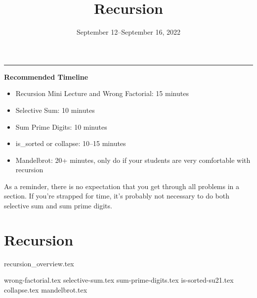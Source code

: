 \documentclass{exam}
\title{Recursion}
\date{September 12--September 16, 2022}
\begin{document}
\maketitle
\rule{\textwidth}{0.15em}
\fontsize{12}{15}\selectfont

\begin{meta}
\textbf{Recommended Timeline}
\begin{itemize}
    \item Recursion Mini Lecture and Wrong Factorial: 15 minutes
    \item Selective Sum: 10 minutes
    \item Sum Prime Digits: 10 minutes
    \item is\_sorted or collapse: 10--15 minutes
    \item Mandelbrot: 20+ minutes, only do if your students are very comfortable with recursion
\end{itemize}
As a reminder, there is no expectation that you get through all problems in a section. If you're strapped for time, it's probably not necessary to do both selective sum and sum prime digits. 
\end{meta}

\section{Recursion}
{recursion_overview.tex}
\begin{questions}
    {wrong-factorial.tex}
    {selective-sum.tex}
    {sum-prime-digits.tex}
    {is-sorted-su21.tex}
    {collapse.tex}
    {mandelbrot.tex}
\end{questions}
\end{document}
